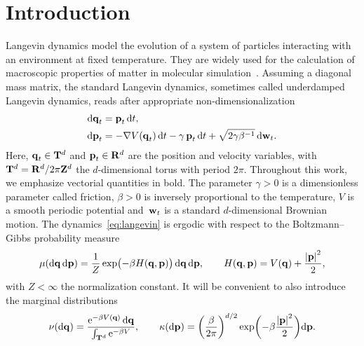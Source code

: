 \documentclass[11pt,a4paper]{article}
\begin{document}
\section{Introduction}%
Langevin dynamics model the evolution of a system of particles interacting with an environment at fixed temperature.
They are widely used for the calculation of macroscopic properties of matter in molecular simulation~\cite{MR2723222,allen2017computer}.
Assuming a diagonal mass matrix,
the standard Langevin dynamics, sometimes called underdamped Langevin dynamics,
reads after appropriate non-dimensionalization~\cite[Section 2.2.4]{MR2681239}
\begin{subequations}
\label{eq:langevin}
\begin{align}
    \label{eq:langevin_q}
    \mathrm d \boldsymbol{\mathbf q}_t &= \boldsymbol{\mathbf p}_t \, \mathrm d t, \\
    \label{eq:langevin_p}
    \mathrm d \boldsymbol{\mathbf p}_t &= - \nabla V(\boldsymbol{\mathbf q}_t) \, \mathrm d t - \gamma \, \boldsymbol{\mathbf p}_t \, \mathrm d t + \sqrt{2 \gamma \beta^{-1}} \, \mathrm d \boldsymbol{\mathbf w}_t.
\end{align}
\end{subequations}
Here, $\boldsymbol{\mathbf q}_t \in \mathbf T^d$ and $\boldsymbol{\mathbf p}_t \in \mathbf R^d$ are the position and velocity variables,
with~$\mathbf T^d = \mathbf R^d / 2\pi \mathbf Z^d$ the $d$-dimensional torus with period $2 \pi$.
Throughout this work, we emphasize vectorial quantities in bold.
The parameter $\gamma > 0$ is a dimensionless parameter called friction,
$\beta > 0$ is inversely proportional to the temperature,
$V$ is a smooth periodic potential
and~$\boldsymbol{\mathbf w}_t$ is a standard $d$-dimensional Brownian motion.
The dynamics~\eqref{eq:langevin} is ergodic with respect to the Boltzmann--Gibbs probability measure
\begin{equation}
    \label{eq:invariant_measure}
    \mu(\d \vect q \, \d \vect p) = \frac{1}{Z} \exp \bigl( - \beta H(\vect q, \vect p)  \bigr) \, \d \vect q \, \d \vect p,
    \qquad H(\vect q, \vect p) = V(\vect q) + \frac{\abs{\vect p}^2}{2},
\end{equation}
with $Z< \infty$ the normalization constant.
It will be convenient to also introduce the marginal distributions
\begin{equation}
    \label{eq:definition_prob_measures}
    \nu(\d \vect q) = \frac{\e^{- \beta V(\vect q)} \, \d \vect q}{\int_{\torus^d}\e^{-\beta V}},
    \qquad \kappa(\d \vect p) = \left( \frac{\beta}{2 \pi} \right)^{d/2}\exp \biggl( - \beta \frac{\abs*{\vect p}^2}{2} \biggr) \d \vect p.
\end{equation}
\end{document}
